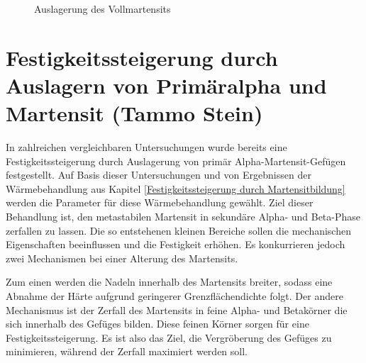 \documentclass[a4paper, 11pt]{tubsreprt}
\begin{document}
\begin{figure}
\caption{Auslagerung des Vollmartensits}
\label{Auslagerung des Vollmartensits}
\end{figure}




\section{Festigkeitssteigerung durch Auslagern von Primäralpha und Martensit (Tammo Stein)}\label{Primäralpha und martensit}
In zahlreichen vergleichbaren Untersuchungen wurde bereits eine Festigkeitssteigerung durch Auslagerung von primär Alpha-Martensit-Gefügen festgestellt. Auf Basis dieser Untersuchungen und von Ergebnissen der Wärmebehandlung aus Kapitel \ref{Festigkeitssteigerung durch Martensitbildung} werden die Parameter für diese Wärmebehandlung gewählt. Ziel dieser Behandlung ist, den metastabilen Martensit in sekundäre Alpha- und Beta-Phase zerfallen zu lassen. Die so entstehenen kleinen Bereiche sollen die mechanischen Eigenschaften beeinflussen und die Festigkeit erhöhen\cite{Gilbert2004}. Es konkurrieren jedoch zwei Mechanismen bei einer Alterung des Martensits. 

Zum einen werden die Nadeln innerhalb des Martensits breiter, sodass eine Abnahme der Härte aufgrund geringerer Grenzflächendichte folgt. Der andere Mechanismus ist der Zerfall des Martensits in feine Alpha- und Betakörner die sich innerhalb des Gefüges bilden. Diese feinen Körner sorgen für eine Festigkeitssteigerung. Es ist also das Ziel, die Vergröberung des Gefüges zu minimieren, während der Zerfall maximiert werden soll. 
\end{document}
